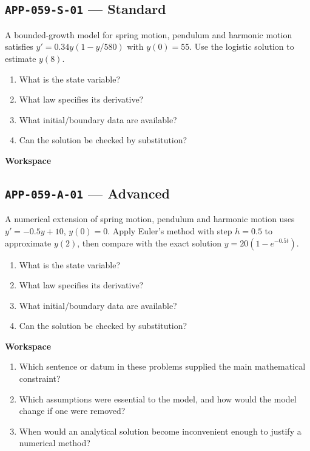 \documentclass[11pt]{book}
\newcommand{\pid}[1]{\texttt{#1}}
\newcommand{\workspace}{\par\vspace{0.7in}\hrulefill\par\vspace{0.55in}\hrulefill\par}
\begin{document}
\subsection*{\pid{APP-059-S-01} — Standard}
\begin{problembox}
A bounded-growth model for spring motion, pendulum and harmonic motion satisfies $y'=0.34y(1-y/580)$ with $y(0)=55$. Use the logistic solution to estimate $y(8)$.
\end{problembox}
\begin{promptbox}\begin{enumerate}
\item What is the state variable?
\item What law specifies its derivative?
\item What initial/boundary data are available?
\item Can the solution be checked by substitution?
\end{enumerate}\end{promptbox}
\textbf{Workspace}\workspace
{}
\subsection*{\pid{APP-059-A-01} — Advanced}
\begin{problembox}
A numerical extension of spring motion, pendulum and harmonic motion uses $y'=-0.5y+10$, $y(0)=0$. Apply Euler's method with step $h=0.5$ to approximate $y(2)$, then compare with the exact solution $y=20(1-e^{-0.5t})$.
\end{problembox}
\begin{promptbox}\begin{enumerate}
\item What is the state variable?
\item What law specifies its derivative?
\item What initial/boundary data are available?
\item Can the solution be checked by substitution?
\end{enumerate}\end{promptbox}
\textbf{Workspace}\workspace
\begin{reflectionbox}\begin{enumerate}
\item Which sentence or datum in these problems supplied the main mathematical constraint?
\item Which assumptions were essential to the model, and how would the model change if one were removed?
\item When would an analytical solution become inconvenient enough to justify a numerical method?
\end{enumerate}\end{reflectionbox}
\end{document}
